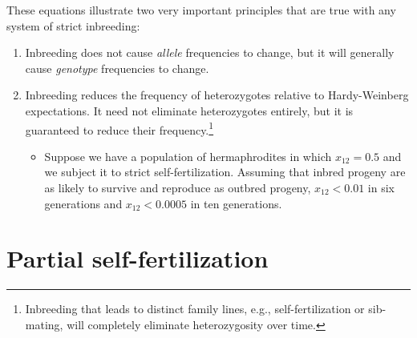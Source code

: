 These equations illustrate two very important principles that are true
with any system of strict inbreeding:

\begin{enumerate}

\item Inbreeding does not cause {\it allele\/} frequencies to change,
  but it will generally cause {\it genotype\/} frequencies to change.

\item Inbreeding reduces the frequency of heterozygotes relative to
  Hardy-Weinberg expectations. It need not eliminate heterozygotes
  entirely, but it is guaranteed to reduce their
  frequency.\footnote{Inbreeding that leads to distinct family lines,
    e.g., self-fertilization or sib-mating, will completely eliminate
    heterozygosity over time.}

\begin{itemize}

\item Suppose we have a population of hermaphrodites in which $x_{12}
= 0.5$ and we subject it to strict self-fertilization. Assuming that
inbred progeny are as likely to survive and reproduce as outbred
progeny, $x_{12} < 0.01$ in six generations and $x_{12} < 0.0005$ in
ten generations.

\end{itemize}

\end{enumerate}

\section*{Partial self-fertilization}

